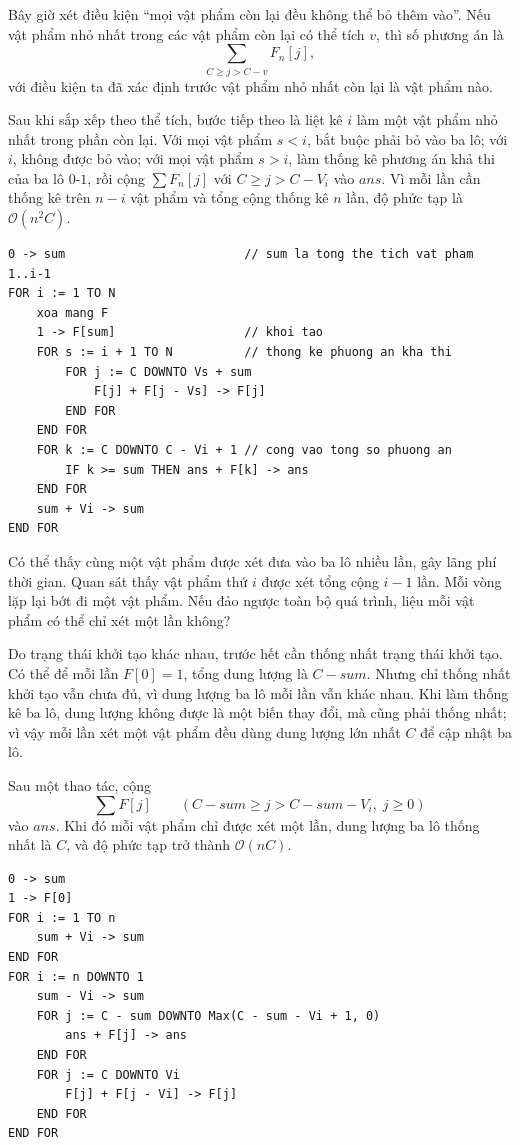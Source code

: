 \documentclass[11pt]{article}
\newcommand{\Oh}{\mathcal{O}}
\begin{document}
Bây giờ xét điều kiện ``mọi vật phẩm còn lại đều không thể bỏ thêm vào''. Nếu
vật phẩm nhỏ nhất trong các vật phẩm còn lại có thể tích \(v\), thì số phương
án là
\[
  \sum_{C\ge j>C-v} F_n[j],
\]
với điều kiện ta đã xác định trước vật phẩm nhỏ nhất còn lại là vật phẩm nào.

Sau khi sắp xếp theo thể tích, bước tiếp theo là liệt kê \(i\) làm một vật
phẩm nhỏ nhất trong phần còn lại. Với mọi vật phẩm \(s<i\), bắt buộc phải bỏ
vào ba lô; với \(i\), không được bỏ vào; với mọi vật phẩm \(s>i\), làm thống
kê phương án khả thi của ba lô \(0\)-\(1\), rồi cộng
\(\sum F_n[j]\) với \(C\ge j>C-V_i\) vào \(\mathit{ans}\). Vì mỗi lần cần
thống kê trên \(n-i\) vật phẩm và tổng cộng thống kê \(n\) lần, độ phức tạp là
\(\Oh(n^2C)\).

\begin{verbatim}
0 -> sum                         // sum la tong the tich vat pham 1..i-1
FOR i := 1 TO N
    xoa mang F
    1 -> F[sum]                  // khoi tao
    FOR s := i + 1 TO N          // thong ke phuong an kha thi
        FOR j := C DOWNTO Vs + sum
            F[j] + F[j - Vs] -> F[j]
        END FOR
    END FOR
    FOR k := C DOWNTO C - Vi + 1 // cong vao tong so phuong an
        IF k >= sum THEN ans + F[k] -> ans
    END FOR
    sum + Vi -> sum
END FOR
\end{verbatim}

Có thể thấy cùng một vật phẩm được xét đưa vào ba lô nhiều lần, gây lãng phí
thời gian. Quan sát thấy vật phẩm thứ \(i\) được xét tổng cộng \(i-1\) lần.
Mỗi vòng lặp lại bớt đi một vật phẩm. Nếu đảo ngược toàn bộ quá trình, liệu
mỗi vật phẩm có thể chỉ xét một lần không?

Do trạng thái khởi tạo khác nhau, trước hết cần thống nhất trạng thái khởi
tạo. Có thể để mỗi lần \(F[0]=1\), tổng dung lượng là \(C-\mathit{sum}\).
Nhưng chỉ thống nhất khởi tạo vẫn chưa đủ, vì dung lượng ba lô mỗi lần vẫn
khác nhau. Khi làm thống kê ba lô, dung lượng không được là một biến thay đổi,
mà cũng phải thống nhất; vì vậy mỗi lần xét một vật phẩm đều dùng dung lượng
lớn nhất \(C\) để cập nhật ba lô.

Sau một thao tác, cộng
\[
  \sum F[j]\qquad
  (C-\mathit{sum}\ge j>C-\mathit{sum}-V_i,\; j\ge 0)
\]
vào \(\mathit{ans}\). Khi đó mỗi vật phẩm chỉ được xét một lần, dung lượng ba
lô thống nhất là \(C\), và độ phức tạp trở thành \(\Oh(nC)\).

\begin{verbatim}
0 -> sum
1 -> F[0]
FOR i := 1 TO n
    sum + Vi -> sum
END FOR
FOR i := n DOWNTO 1
    sum - Vi -> sum
    FOR j := C - sum DOWNTO Max(C - sum - Vi + 1, 0)
        ans + F[j] -> ans
    END FOR
    FOR j := C DOWNTO Vi
        F[j] + F[j - Vi] -> F[j]
    END FOR
END FOR
\end{verbatim}
\end{document}
